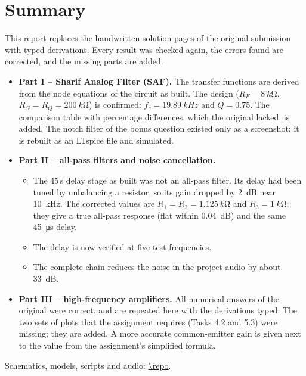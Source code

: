 
\newcommand{\ReportShortTitle}{Circuit Theory project -- active filters, noise cancellation, HF amplifiers}


\section*{Summary}
This report replaces the handwritten solution pages of the original submission with typed derivations.
Every result was checked again, the errors found are corrected, and the missing parts are added.
\begin{itemize}
  \item \textbf{Part I -- Sharif Analog Filter (SAF).} The transfer functions are derived from the
    node equations of the circuit as built. The design ($R_F = \SI{8}{k\ohm}$, $R_G = R_Q =
    \SI{200}{k\ohm}$) is confirmed: $f_c = \SI{19.89}{kHz}$ and $Q = 0.75$. The comparison table
    with percentage differences, which the original lacked, is added. The notch filter of the bonus
    question existed only as a screenshot; it is rebuilt as an LTspice file and simulated.
  \item \textbf{Part II -- all-pass filters and noise cancellation.}
    \begin{itemize}
      \item The 45\,\textmu s delay stage as built was not an all-pass filter. Its delay had been
        tuned by unbalancing a resistor, so its gain dropped by \SI{2}{dB} near \SI{10}{kHz}.
        The corrected values are $R_1=R_2=\SI{1.125}{k\ohm}$ and $R_3=\SI{1}{k\ohm}$: they give a
        true all-pass response (flat within \SI{0.04}{dB}) and the same \SI{45}{\micro s} delay.
      \item The delay is now verified at five test frequencies.
      \item The complete chain reduces the noise in the project audio by about \SI{33}{dB}.
    \end{itemize}
  \item \textbf{Part III -- high-frequency amplifiers.} All numerical answers of the original were
    correct, and are repeated here with the derivations typed. The two sets of plots that the
    assignment requires (Tasks 4.2 and 5.3) were missing; they are added. A more accurate common-emitter
    gain is given next to the value from the assignment's simplified formula.
\end{itemize}
Schematics, models, scripts and audio: \url{\repo}.

